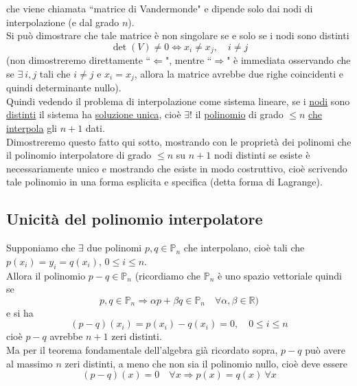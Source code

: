 \documentclass[12pt,headings=optiontohead]{article}
\begin{document}
che viene chiamata ``matrice di Vandermonde" e dipende solo dai nodi di interpolazione (e dal grado $n$).\\
Si può dimostrare che tale matrice è non singolare se e solo se i nodi sono distinti
\[ \det(V) \ne 0 \iff x_i \ne x_j, \quad i \ne j \]
(non dimostreremo direttamente ``$\Leftarrow$", mentre ``$\Rightarrow$" è immediata osservando che se $\exists \ i,j$ tali che $i\neq j$ e $x_i = x_j$, allora la matrice avrebbe due righe coincidenti e quindi determinante nullo).\\ 
Quindi vedendo il problema di interpolazione come sistema lineare, se i \uline{nodi} sono \uline{distinti} il sistema ha \uline{soluzione unica}, cioè \uline{$\exists !$} il \uline{polinomio} di grado $\leq n$ \uline{che interpola} gli $n+1$ dati.\\
Dimostreremo questo fatto qui sotto, mostrando con le proprietà dei polinomi che il polinomio interpolatore di grado $\leq n$ su $n+1$ nodi distinti se esiste è necessariamente unico e mostrando che esiste in modo costruttivo, cioè scrivendo tale polinomio in una forma esplicita e specifica (detta forma di Lagrange).

\subsection{Unicità del polinomio interpolatore}
Supponiamo che $\exists$ due polinomi $p,q \in \mathbb{P}_n$ che interpolano, cioè tali che $p(x_i)=y_i=q(x_i)$, $0\leq i \leq n$.\\ Allora il polinomio $p-q \in \mathbb{P}_n$ (ricordiamo che $\mathbb{P}_n$ è uno spazio vettoriale quindi se
\[ p, q \in \mathbb{P}_n \Rightarrow \alpha p + \beta q \in \mathbb{P}_n \quad \forall \alpha, \beta \in \mathbb{R}) \]
e si ha
\[ (p-q)(x_i) = p(x_i) - q(x_i) = 0, \quad 0 \le i \le n \]
cioè $p-q$ avrebbe $n+1$ zeri distinti.\\
Ma per il teorema fondamentale dell'algebra già ricordato sopra, $p-q$ può avere al massimo $n$ zeri distinti, a meno che non sia il polinomio nullo, cioè deve essere
\[ (p-q)(x) = 0 \quad \forall x \Rightarrow p(x) = q(x) \ \forall x \]
\end{document}
